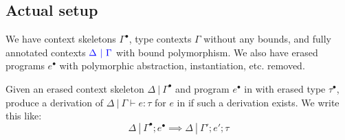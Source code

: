 \subsection{Actual setup}

We have context skeletons $\Gamma^{\bullet}$, type contexts $\Gamma$ without any
bounds, and fully annotated contexts $\textcolor{blue}{\Delta \ | \ \Gamma}$ with bound
polymorphism. 
We also have erased programs $e^{\bullet}$ with polymorphic abstraction,
instantiation, etc. removed.


\begin{definition}
Given an erased context skeleton $\Delta \ | \ \Gamma^{\bullet}$ and program
$e^{\bullet}$ in \Lang with erased type $\tau^{\bullet}$, produce a derivation
of $\Delta \ | \ \Gamma \vdash e : \tau$ for $e$ in \bnd{\Lang} if such a
derivation exists. We write this like: $$\Delta \ | \ \Gamma^{\bullet};
e^{\bullet} \implies \Delta \ | \ \Gamma'; e'; \tau$$
\end{definition}

